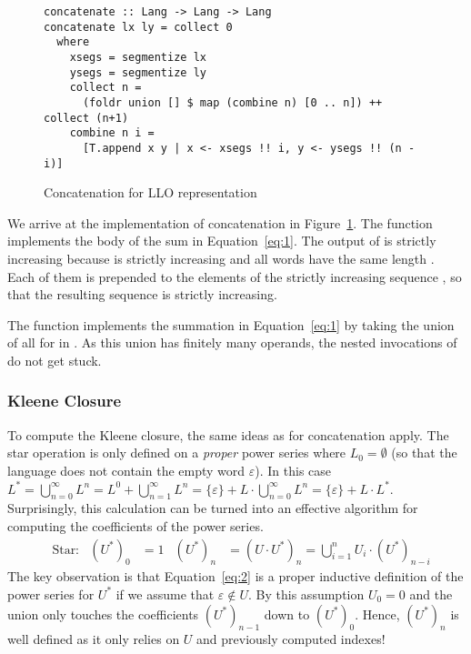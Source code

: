 \begin{figure}[tp]
\begin{lstlisting}
concatenate :: Lang -> Lang -> Lang
concatenate lx ly = collect 0
  where
    xsegs = segmentize lx
    ysegs = segmentize ly
    collect n =
      (foldr union [] $ map (combine n) [0 .. n]) ++ collect (n+1)
    combine n i =
      [T.append x y | x <- xsegs !! i, y <- ysegs !! (n - i)]
\end{lstlisting}
  \caption{Concatenation for LLO representation}
  \label{fig:concatenate-with-segments}
\end{figure}
We arrive at the implementation of concatenation in Figure~\ref{fig:concatenate-with-segments}.
The function  implements the body of the sum
in Equation~\eqref{eq:1}. The output of  is strictly increasing
because  is strictly increasing and all words have the same length .
Each of them is prepended to the elements of the strictly increasing
sequence , so that the resulting sequence is
strictly increasing.

The function  implements the summation in Equation~\eqref{eq:1}
by taking the union of all  for  in \code{[0
.. n]}. As this union has finitely many operands, the nested
invocations of  do not get stuck.

\subsubsection{Kleene Closure}

To compute the Kleene closure, the same ideas as for
concatenation apply. The star operation is only defined on a \emph{proper}
power series where $L_0 = \emptyset$ (so that the language does not
contain the empty word $\varepsilon$). In this case $L^* =
\bigcup_{n=0}^\infty L^n = L^0 + \bigcup_{n=1}^\infty L^n = \{\varepsilon\}
+ L \cdot \bigcup_{n=0}^\infty L^n  =   \{\varepsilon\}
+ L \cdot L^*$. Surprisingly, this calculation can be turned into an
effective algorithm for computing the coefficients of the power series. 
\begin{align}
  \label{eq:2}
  &\text{Star:}
  & (U^*)_0 &= 1
  & (U^*)_n &= (U \cdot U^*)_n = \bigcup_{i=1}^n U_i\cdot (U^*)_{n-i}
\end{align}
The key observation is that Equation~\eqref{eq:2} is a proper
inductive definition of the power series for $U^*$ if we assume that
$\varepsilon \notin U$. By this assumption $U_0 = 0$ and the union
only touches the coefficients $(U^*)_{n-1}$ down to $(U^*)_0$. Hence, $(U^*)_n$ is well
defined as it only relies on $U$ and previously computed indexes!


